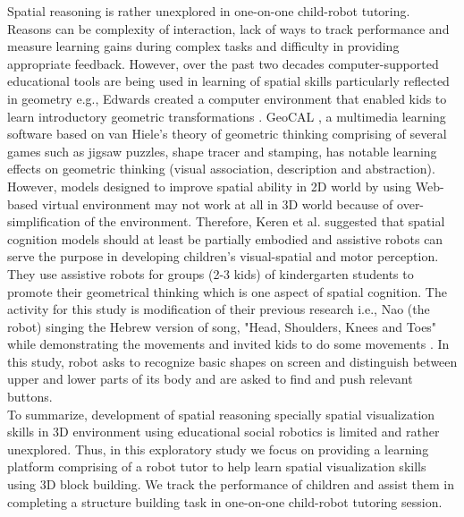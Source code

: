 Spatial reasoning is rather unexplored in one-on-one child-robot tutoring. Reasons can be complexity of interaction, lack of ways to track performance and measure learning gains during complex tasks and difficulty in providing appropriate feedback. However, over the past two decades computer-supported educational tools are being used in learning of spatial skills particularly reflected in geometry e.g., Edwards created a computer environment that enabled kids to learn introductory geometric transformations \parencite{edwards1991children}. GeoCAL \parencite{chang2007developing}, a multimedia learning software based on van Hiele's theory of geometric thinking \parencite{chang2007developing} comprising of several games such as jigsaw puzzles, shape tracer and stamping, has notable learning effects on geometric thinking (visual association, description and abstraction). \\
However, models designed to improve spatial ability in 2D world by using Web-based virtual environment \parencite{rafi2005improving}  may not work at all in 3D world because of over-simplification of the environment. Therefore, Keren et al. 
\parencite{keren2012kindergarten} suggested that spatial cognition models should at least be partially embodied and assistive robots can serve the purpose in developing children's visual-spatial and motor perception. They use assistive robots for groups (2-3 kids) of kindergarten students to promote their geometrical thinking which is one aspect of spatial cognition. The activity for this study is modification of their previous research i.e., Nao (the robot) singing the Hebrew version of song, "Head, Shoulders, Knees and Toes" while demonstrating the movements and invited kids to do some movements \parencite{fridin2014robotics}. In this study, robot asks to recognize basic shapes on screen and distinguish between upper and lower parts of its body and are asked to find and push relevant buttons. \\
To summarize, development of spatial reasoning specially spatial visualization skills in 3D environment using educational social robotics is limited and rather unexplored. Thus, in this exploratory study we focus on providing a learning platform comprising of a robot tutor to help learn spatial visualization skills using 3D block building. We track the performance of children and assist them in completing a structure building task in one-on-one child-robot tutoring session.     

